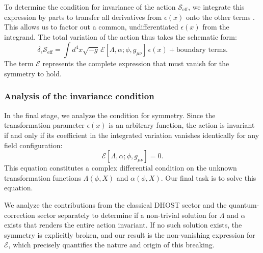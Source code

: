 \documentclass[twocolumn]{aastex631}
\begin{document}
To determine the condition for invariance of the action $\mathcal{S}_{\text{eff}}$, we integrate this expression by parts to transfer all derivatives from $\epsilon(x)$ onto the other terms \citep{gieres2022improvementconservedcurrentdensity,peng2025extractingexpressionfieldequations}. This allows us to factor out a common, undifferentiated $\epsilon(x)$ from the integrand. The total variation of the action thus takes the schematic form:
\begin{equation}
\delta_\epsilon \mathcal{S}_{\text{eff}} = \int d^4x \sqrt{-g} \, \mathcal{E}[\Lambda, \alpha; \phi, g_{\mu\nu}] \, \epsilon(x) + \text{boundary terms}.
\end{equation}
The term $\mathcal{E}$ represents the complete expression that must vanish for the symmetry to hold.
\subsubsection{Analysis of the invariance condition}
In the final stage, we analyze the condition for symmetry. Since the transformation parameter $\epsilon(x)$ is an arbitrary function, the action is invariant if and only if its coefficient in the integrated variation vanishes identically for any field configuration:
\begin{equation}
\mathcal{E}[\Lambda, \alpha; \phi, g_{\mu\nu}] = 0.
\end{equation}
This equation constitutes a complex differential condition on the unknown transformation functions $\Lambda(\phi, X)$ and $\alpha(\phi, X)$. Our final task is to solve this equation.

We analyze the contributions from the classical DHOST sector and the quantum-correction sector separately to determine if a non-trivial solution for $\Lambda$ and $\alpha$ exists that renders the entire action invariant. If no such solution exists, the symmetry is explicitly broken, and our result is the non-vanishing expression for $\mathcal{E}$, which precisely quantifies the nature and origin of this breaking.
\end{document}
